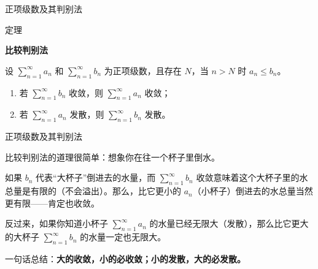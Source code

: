 \documentclass[aspectratio=169,10pt,fontset=fandol]{ctexbeamer}
\newenvironment{custom}[1]{\par\noindent\textbf{#1}\quad}{\par\vspace{0.8em}}
\begin{document}
\begin{frame}[t,fragile]{正项级数及其判别法}
\footnotesize
\begin{block}{定理}
{\footnotesize
\textbf{比较判别法}\par

设 \(\sum\limits_{n = 1}^{  \infty } a_n\) 和 \(\sum\limits_{n = 1}^{  \infty } b_n\) 为正项级数，且存在 \(N\)，当 \(n > N\) 时 \(a_n \leq b_n\)。
\begin{enumerate}
\item 若 \(\sum\limits_{n = 1}^{  \infty } b_n\) 收敛，则 \(\sum\limits_{n = 1}^{  \infty } a_n\) 收敛；
\item 若 \(\sum\limits_{n = 1}^{  \infty } a_n\) 发散，则 \(\sum\limits_{n = 1}^{  \infty } b_n\) 发散。
\end{enumerate}

}
\end{block}
\end{frame}
\begin{frame}[t,fragile]{正项级数及其判别法}
\footnotesize
{\footnotesize
比较判别法的道理很简单：想象你在往一个杯子里倒水。

如果 \(b_n\) 代表“大杯子”倒进去的水量，而 \(\sum\limits_{n = 1}^{  \infty } b_n\) 收敛意味着这个大杯子里的水总量是有限的（不会溢出）。那么，比它更小的 \(a_n\)（小杯子）倒进去的水总量当然更有限——肯定也收敛。

反过来，如果你知道小杯子 \(\sum\limits_{n = 1}^{  \infty } a_n\) 的水量已经无限大（发散），那么比它更大的大杯子 \(\sum\limits_{n = 1}^{  \infty } b_n\) 的水量一定也无限大。

一句话总结：\textbf{大的收敛，小的必收敛；小的发散，大的必发散。}

}
\end{frame}
\end{document}
